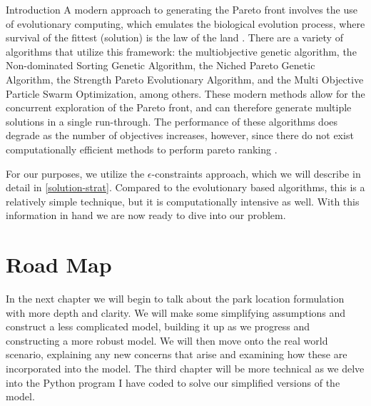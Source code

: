 \documentclass[12pt]{pom_thesis}
\theoremstyle{definition}
\begin{document}
\begin{chapter}{Introduction}
	A modern approach to generating the Pareto front involves the use of evolutionary computing, which emulates the biological evolution process, where survival of the fittest (solution) is the law of the land \cite{pareto-mo}. There are a variety of algorithms that utilize this framework: the multiobjective genetic algorithm, the Non-dominated Sorting Genetic Algorithm, the Niched Pareto Genetic Algorithm, the Strength Pareto Evolutionary Algorithm, and the Multi Objective Particle Swarm Optimization, among others. These modern methods allow for the concurrent exploration of the Pareto front, and can therefore generate multiple solutions in a single run-through. The performance of these algorithms does degrade as the number of objectives increases, however, since there do not exist computationally efficient methods to perform pareto ranking \cite{pareto-mo}. 
	
	For our purposes, we utilize the $\epsilon$-constraints approach, which we will describe in detail in \autoref{solution-strat}. Compared to the evolutionary based algorithms, this is a relatively simple technique, but it is computationally intensive as well. With this information in hand we are now ready to dive into our problem.
%
%
\section{Road Map}
In the next chapter we will begin to talk about the park location formulation with more depth and clarity. We will make some simplifying assumptions and construct a less complicated model, building it up as we progress and constructing a more robust model. We will then move onto the real world scenario, explaining any new concerns that arise and examining how these are incorporated into the model. The third chapter will be more technical as we delve into the Python program I have coded to solve our simplified versions of the model.
\end{chapter}
\end{document}
